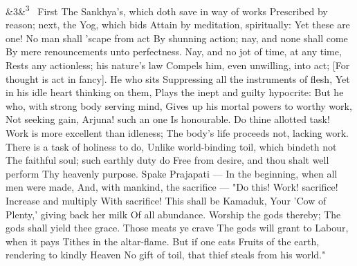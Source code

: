 \documentclass[12pt]{article}
\newcommand{\para}[1][]{\par\noindent\ifx&#1&\else\textsuperscript{\footnotesize #1}~\fi}
\begin{document}
\para[3] First The Sankhya's, which doth save in way of works Prescribed by reason; next, the Yog, which bids Attain by meditation, spiritually: Yet these are one! No man shall 'scape from act By shunning action; nay, and none shall come By mere renouncements unto perfectness. Nay, and no jot of time, at any time, Rests any actionless; his nature's law Compels him, even unwilling, into act; [For thought is act in fancy]. He who sits Suppressing all the instruments of flesh, Yet in his idle heart thinking on them, Plays the inept and guilty hypocrite: But he who, with strong body serving mind, Gives up his mortal powers to worthy work, Not seeking gain, Arjuna! such an one Is honourable. Do thine allotted task! Work is more excellent than idleness; The body's life proceeds not, lacking work. There is a task of holiness to do, Unlike world-binding toil, which bindeth not The faithful soul; such earthly duty do Free from desire, and thou shalt well perform Thy heavenly purpose. Spake Prajapati --- In the beginning, when all men were made, And, with mankind, the sacrifice --- "Do this! Work! sacrifice! Increase and multiply With sacrifice! This shall be Kamaduk, Your 'Cow of Plenty,' giving back her milk Of all abundance. Worship the gods thereby; The gods shall yield thee grace. Those meats ye crave The gods will grant to Labour, when it pays Tithes in the altar-flame. But if one eats Fruits of the earth, rendering to kindly Heaven No gift of toil, that thief steals from his world."
\end{document}
